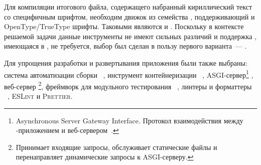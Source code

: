     Для компиляции итогового \pdf{} файла, содержащего набранный кириллический текст со специфичным шрифтом, необходим движок из семейства \tex{}, поддерживающий \unicode{} и OpenType/TrueType шрифты. Таковыми являются \xelatex{} и \lualatex{}. Поскольку в контексте решаемой задачи данные инструменты не имеют сильных различий и поддержка \lua{}, имеющаяся в \lualatex{}, не требуется, выбор был сделан в пользу первого варианта~--- \xelatex{}.

    Для упрощения разработки и развертывания приложения были также выбраны: система автоматизации сборки \make{}~\cite{stallman2023gnu}, инструмент контейнеризации \docker{}~\cite{dockerReference}, \textsc{ASGI}-сервер\footnote{Asynchronous Server Gateway Interface. Протокол взаимодействия между \python{}-приложением и веб-сервером~\cite{asgidocs}.} \uvicorn{}, веб-сервер \nginx{}\footnote{Принимает входящие запросы, обслуживает статические файлы и перенаправляет динамические запросы к \textsc{ASGI}-серверу.}, фреймворк для модульного тестирования \pytest{}~\cite{pytestDocs}, линтеры и форматтеры \ruff{}~\cite{ruffDocs}, \textsc{ESLint} и \textsc{Prettier}.



